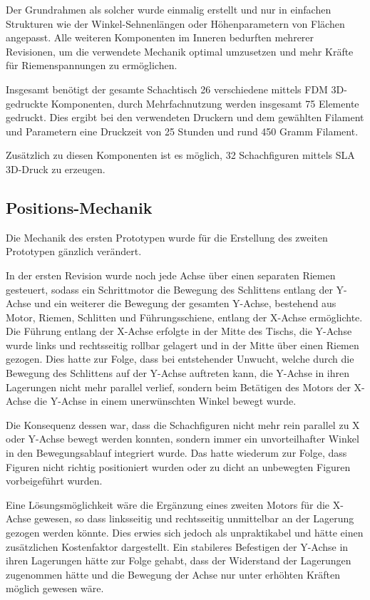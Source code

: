 Der Grundrahmen als solcher wurde einmalig erstellt und nur in einfachen
Strukturen wie der Winkel-Sehnenlängen oder Höhenparametern von Flächen
angepasst. Alle weiteren Komponenten im Inneren bedurften mehrerer
Revisionen, um die verwendete Mechanik optimal umzusetzen und mehr
Kräfte für Riemenspannungen zu ermöglichen.

Insgesamt benötigt der gesamte Schachtisch 26 verschiedene mittels FDM
3D-gedruckte Komponenten, durch Mehrfachnutzung werden insgesamt 75
Elemente gedruckt. Dies ergibt bei den verwendeten Druckern und dem
gewählten Filament und Parametern eine Druckzeit von 25 Stunden und rund
450 Gramm Filament.

Zusätzlich zu diesen Komponenten ist es möglich, 32 Schachfiguren
mittels SLA 3D-Druck zu erzeugen.

\hypertarget{positions-mechanik}{%
\subsection{Positions-Mechanik}\label{positions-mechanik}}

Die Mechanik des ersten Prototypen wurde für die Erstellung des zweiten
Prototypen gänzlich verändert.

In der ersten Revision wurde noch jede Achse über einen separaten Riemen
gesteuert, sodass ein Schrittmotor die Bewegung des Schlittens entlang
der Y-Achse und ein weiterer die Bewegung der gesamten Y-Achse,
bestehend aus Motor, Riemen, Schlitten und Führungsschiene, entlang der
X-Achse ermöglichte. Die Führung entlang der X-Achse erfolgte in der
Mitte des Tischs, die Y-Achse wurde links und rechtsseitig rollbar
gelagert und in der Mitte über einen Riemen gezogen. Dies hatte zur
Folge, dass bei entstehender Unwucht, welche durch die Bewegung des
Schlittens auf der Y-Achse auftreten kann, die Y-Achse in ihren
Lagerungen nicht mehr parallel verlief, sondern beim Betätigen des
Motors der X-Achse die Y-Achse in einem unerwünschten Winkel bewegt
wurde.

Die Konsequenz dessen war, dass die Schachfiguren nicht mehr rein
parallel zu X oder Y-Achse bewegt werden konnten, sondern immer ein
unvorteilhafter Winkel in den Bewegungsablauf integriert wurde. Das
hatte wiederum zur Folge, dass Figuren nicht richtig positioniert wurden
oder zu dicht an unbewegten Figuren vorbeigeführt wurden.

Eine Lösungsmöglichkeit wäre die Ergänzung eines zweiten Motors für die
X-Achse gewesen, so dass linksseitig und rechtsseitig unmittelbar an der
Lagerung gezogen werden könnte. Dies erwies sich jedoch als
unpraktikabel und hätte einen zusätzlichen Kostenfaktor dargestellt. Ein
stabileres Befestigen der Y-Achse in ihren Lagerungen hätte zur Folge
gehabt, dass der Widerstand der Lagerungen zugenommen hätte und die
Bewegung der Achse nur unter erhöhten Kräften möglich gewesen wäre.

